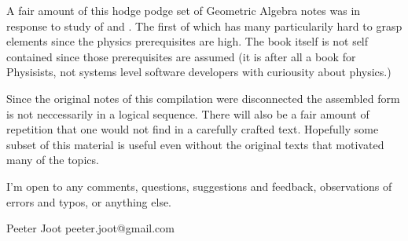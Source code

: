 A fair amount of this hodge podge set of Geometric Algebra notes 
was in response to study of \cite{doran2003gap} and
\cite{hestenes1999nfc}.  The first of which has many particularily hard to 
grasp elements since the physics prerequisites are high.  The book itself
is not self contained since those prerequisites are assumed (it is after
all a book for Physisists, not systems level software developers with 
curiousity about physics.)


Since the original notes of this compilation were disconnected the
assembled form is not neccessarily in a logical sequence.  There will also
be a fair amount of repetition that one would not find in a carefully
crafted text.  Hopefully some subset of this material is useful
even without the original texts that motivated many of the topics.

I'm open to any comments, questions, suggestions and feedback,
observations of errors and typos, or anything else.

Peeter Joot  \quad peeter.joot@gmail.com 
